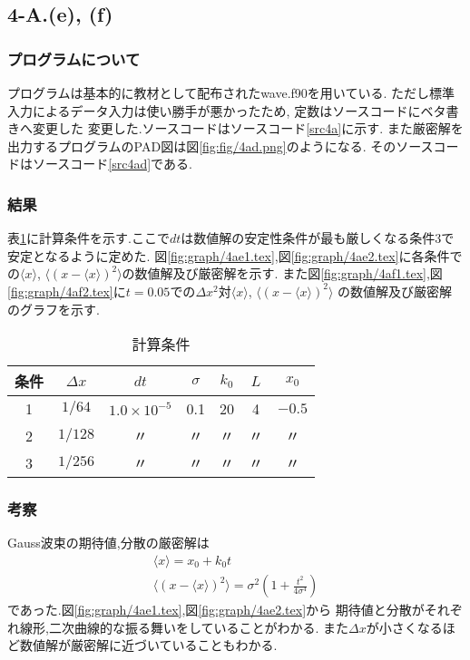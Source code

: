 \subsection*{4-A.(e), (f)}
\subsubsection*{プログラムについて}
プログラムは基本的に教材として配布されたwave.f90を用いている.
ただし標準入力によるデータ入力は使い勝手が悪かったため,
定数はソースコードにベタ書きへ変更した
変更した.ソースコードはソースコード\ref{src4a}に示す.
また厳密解を出力するプログラムのPAD図は図\ref{fig:fig/4ad.png}のようになる.
そのソースコードはソースコード\ref{src4ad}である.
\subsubsection*{結果}
表\ref{tab:4aef_cond}に計算条件を示す.ここで$dt$は数値解の安定性条件が最も厳しくなる条件3で安定となるように定めた.
図\ref{fig:graph/4ae1.tex},図\ref{fig:graph/4ae2.tex}に各条件での$\langle x\rangle$, $\langle (x-\langle x\rangle)^2\rangle$の数値解及び厳密解を示す.
また図\ref{fig:graph/4af1.tex},図\ref{fig:graph/4af2.tex}に$t=0.05$での$\Delta x^2$対$\langle x\rangle$, $\langle (x-\langle x\rangle)^2\rangle$
の数値解及び厳密解のグラフを示す.
\begin{table}[h]
  \caption{計算条件}
  \label{tab:4aef_cond}
  \centering
  \begin{tabular}{ccccccc}
  \hline
  条件&$\Delta x$&$dt$&$\sigma$&$k_0$&$L$&$x_0$\\
  \hline \hline
  1&$1/64 $&$1.0\times 10^{-5}$&0.1&20&4&$-0.5$\\
  2&$1/128$&〃&〃&〃&〃&〃\\
  3&$1/256$&〃&〃&〃&〃&〃\\
  \hline
  \end{tabular}
\end{table}
\newpage
\subsubsection*{考察}
Gauss波束の期待値,分散の厳密解は
\begin{align}
  \langle x\rangle=x_0+k_0t\\
  \langle (x-\langle x\rangle)^2\rangle=\sigma^2\left(1+\frac{t^2}{4\sigma^4}\right)
\end{align}
であった.図\ref{fig:graph/4ae1.tex},図\ref{fig:graph/4ae2.tex}から
期待値と分散がそれぞれ線形,二次曲線的な振る舞いをしていることがわかる.
また$\Delta x$が小さくなるほど数値解が厳密解に近づいていることもわかる.

